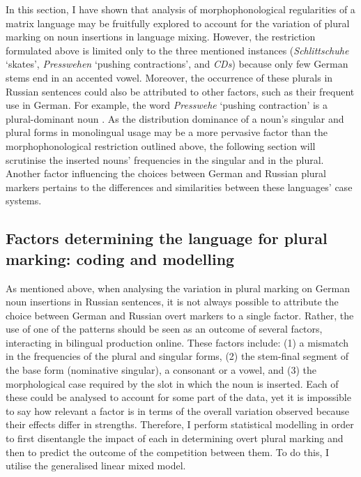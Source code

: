 In this section, I have shown that analysis of morphophonological regularities of a matrix language may be fruitfully explored to account for the variation of plural marking on noun insertions in language mixing. However, the restriction formulated above is limited only to the three mentioned instances (\textit{Schlittschuhe} `skates', \textit{Presswehen} `pushing contractions', and \textit{CDs}) because only few German stems end in an accented vowel. Moreover, the occurrence of these plurals in Russian sentences could also be attributed to other factors, such as their frequent use in German. For example, the word \textit{Presswehe} `pushing contraction' is a plural-dominant noun \citep{duden13}. As the distribution dominance of a noun's singular and plural forms in monolingual usage may be a more pervasive factor than the morphophonological restriction outlined above, the following section will scrutinise the inserted nouns' frequencies in the singular and in the plural. Another factor influencing the choices between German and Russian plural markers pertains to the differences and similarities between these languages’ case systems.

\subsection{Factors determining the language for plural marking: coding and modelling}\label{factors}

As mentioned above, when analysing the variation in plural marking on German noun insertions in Russian sentences, it is not always possible to attribute the choice between German and Russian overt markers to a single factor. Rather, the use of one of the patterns should be seen as an outcome of several factors, interacting in bilingual production online. These factors include: (1) a mismatch in the frequencies of the plural and singular forms, (2) the stem-final segment of the base form (nominative singular), a consonant or a vowel, and (3) the morphological case required by the slot in which the noun is inserted. Each of these could be analysed to account for some part of the data, yet it is impossible to say how relevant a factor is in terms of the overall variation observed because their effects differ in strengths. Therefore, I perform statistical modelling in order to first disentangle the impact of each in determining overt plural marking and then to predict the outcome of the competition between them. To do this, I utilise the generalised linear mixed model.


